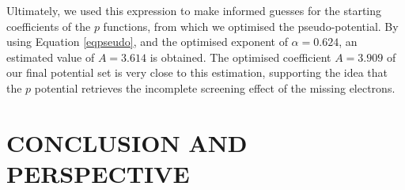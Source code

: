 \documentclass[12pt]{article}
\begin{document}
Ultimately, we used this expression to make informed guesses for the starting coefficients of the $p$ functions, from which we optimised the pseudo-potential.
By using Equation \ref{eqpseudo}, and the optimised exponent of $\alpha=0.624$, an estimated value of $A=3.614$ is obtained.  
The optimised coefficient $A=3.909$ of our final potential set is very close to this estimation, 
supporting the idea that the $p$ potential retrieves the incomplete screening effect of the missing electrons. 






\section*{\sffamily \Large CONCLUSION AND PERSPECTIVE}
\end{document}

